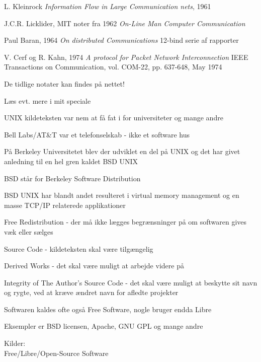 
\begin{list1}
\item L. Kleinrock \emph{Information Flow in Large Communication nets}, 1961
\item J.C.R. Licklider, MIT noter fra 1962 \emph{On-Line Man Computer
  Communication} 
\item Paul Baran, 1964 \emph{On distributed Communications}
12-bind serie af rapporter\\
\item V. Cerf og R. Kahn, 1974 
\emph{A protocol for Packet Network Interconnection}
IEEE Transactions on Communication, vol. COM-22, pp. 637-648, May 1974
\item De tidlige notater kan findes på nettet!
\end{list1}

Læs evt. mere i mit speciale 



\begin{list1}
  \item UNIX kildeteksten var nem at få fat i for universiteter og
  mange andre
\item Bell Labs/AT\&T var et telefonselskab - ikke et software hus
\item På Berkeley Universitetet blev der udviklet en del på UNIX og
  det har givet anledning til en hel gren kaldet BSD UNIX
\item BSD står for Berkeley Software Distribution
\item BSD UNIX har blandt andet resulteret i virtual memory management
  og en masse TCP/IP relaterede applikationer
\end{list1}


\begin{list1}
\item Free Redistribution - der må ikke lægges begrænsninger på om
  softwaren gives væk eller sælges
\item Source Code - kildeteksten skal være tilgængelig 
\item Derived Works - det skal være muligt at arbejde videre på 
\item Integrity of The Author's Source Code - det skal være muligt at
  beskytte sit navn og rygte, ved at kræve ændret navn for
  afledte projekter
\item Softwaren kaldes ofte også Free Software, nogle bruger endda Libre
\item Eksempler er BSD licensen, Apache, GNU GPL og mange andre
\item Kilder: \\
 Free/Libre/Open-Source Software  
\end{list1}

